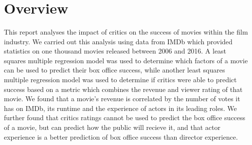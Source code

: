 \section{Overview}
    \paragraph{}
        This report analyses the impact of critics on the success of movies within the
            film industry.
        We carried out this analysis using data from IMDb which provided statistics on
            one thousand movies released between 2006 and 2016.
        A least squares multiple regression model was used to determine which factors
            of a movie can be used to predict their box office success, while another least
            squares multiple regression model was used to determine if critics were able to
            predict success based on a metric which combines the revenue and viewer rating
            of that movie.
        We found that a movie's revenue is correlated by the number of votes it has on
            IMDb, its runtime and the experience of actors in its leading roles.
        We further found that critics ratings cannot be used to predict the box office
            success of a movie, but can predict how the public will recieve it, and that
            actor experience is a better prediction of box office success than director
            experience.

